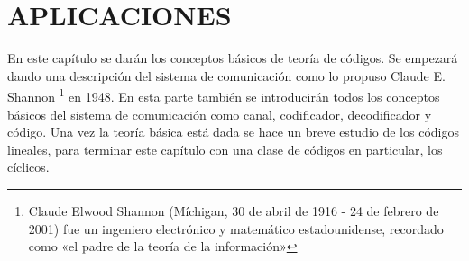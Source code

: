 \chapter{APLICACIONES}
En este capítulo se darán los conceptos básicos de teoría de códigos. Se empezará dando una descripción del sistema de comunicación como lo propuso Claude E. Shannon \footnote{Claude Elwood Shannon (Míchigan, 30 de abril de 1916 - 24 de febrero de 2001) fue un ingeniero electrónico y matemático estadounidense, recordado como «el padre de la teoría de la información»} en 1948. En esta parte también se introducirán todos los conceptos básicos del sistema de comunicación como canal, codificador, decodificador y código. Una vez la teoría básica está dada se hace un breve estudio de los códigos lineales, para terminar este capítulo con una clase de códigos en particular, los cíclicos. 

